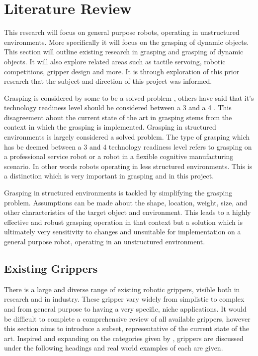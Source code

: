 \chapter{Literature Review}\label{LitReview}

This research will focus on general purpose robots, operating in unstructured environments. More specifically it will focus on the grasping of dynamic objects. This section will outline existing research in grasping and grasping of dynamic objects. It will also explore related areas such as tactile servoing, robotic competitions, gripper design and more. It is through exploration of this prior research that the subject and direction of this project was informed.


Grasping is considered by some to be a solved problem \cite{APCObservations}, others have said that it's technology readiness level should be considered between a 3 and a 4 \cite{KukayouBot}. This disagreement about the current state of the art in grasping stems from the context in which the grasping is implemented. Grasping in structured environments is largely considered a solved problem. The type of grasping which has be deemed between a 3 and 4 technology readiness level refers to grasping on a professional service robot or a robot in a flexible cognitive manufacturing scenario. In other words robots operating in less structured environments. This is a distinction which is very important in grasping and in this project.

Grasping in structured environments is tackled by simplifying the grasping problem. Assumptions can be made about the shape, location, weight, size, and other characteristics of the target object and environment. This leads to a highly effective and robust grasping operation in that context but a solution which is ultimately very sensitivity to changes and unsuitable for implementation on a general purpose robot, operating in an unstructured environment.


\section{Existing Grippers}

There is a large and diverse range of existing robotic grippers, visible both in research and in industry. These gripper vary widely from simplistic to complex and from general purpose to having a very specific, niche applications. It would be difficult to complete a comprehensive review of all available grippers, however this section aims to introduce a subset, representative of the current state of the art. Inspired and expanding on the categories given by \cite{APCinhandproxandcontact}, grippers are discussed under the following headings and real world examples of each are given.


